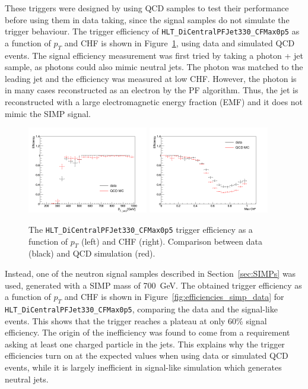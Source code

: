 These triggers were designed by using \acs{QCD} samples to test their performance before using them in data taking, since the signal samples do not simulate the trigger behaviour. The trigger efficiency of \texttt{HLT\_DiCentralPFJet330\_CFMax0p5} as a function of $p_{T}$ and CHF is shown in Figure~\ref{fig:efficiencies_qcd_data}, using data and simulated \acs{QCD} events. The signal efficiency measurement was first tried by taking a photon + jet sample, as photons could also mimic neutral jets. The photon was matched to the leading jet and the efficiency was measured at low CHF. However, the photon is in many cases reconstructed as an electron by the \ac{PF} algorithm. Thus, the jet is reconstructed with a large electromagnetic energy fraction (EMF) and it does not mimic the \ac{SIMP} signal. 

\begin{figure}[ht]
  \centering
  \includegraphics[width=0.47\textwidth]{figures/trigger/pt_eff_05_DataMC.png}\hfill%
  \includegraphics[width=0.47\textwidth]{figures/trigger/chf_eff_05_DataMC.png}
  \caption{The \texttt{HLT\_DiCentralPFJet330\_CFMax0p5} trigger efficiency as a function of $p_{T}$ (left) and CHF (right). Comparison between data (black) and \acs{QCD} simulation (red). }
  \label{fig:efficiencies_qcd_data}
\end{figure}

Instead, one of the neutron signal samples described in Section~\ref{sec:SIMPs} was used, generated with a \ac{SIMP} mass of \SI{700}{GeV}. The obtained trigger efficiency as a function of $p_{T}$ and CHF is shown in Figure~\ref{fig:efficiencies_simp_data} for \texttt{HLT\_DiCentralPFJet330\_CFMax0p5}, comparing the data and the signal-like events. This shows that the trigger reaches a plateau at only 60\% signal efficiency. The origin of the inefficiency was found to come from a requirement asking at least one charged particle in the jets. This explains why the trigger efficiencies turn on at the expected values when using data or simulated \acs{QCD} events, while it is largely inefficient in signal-like simulation which generates neutral jets.


